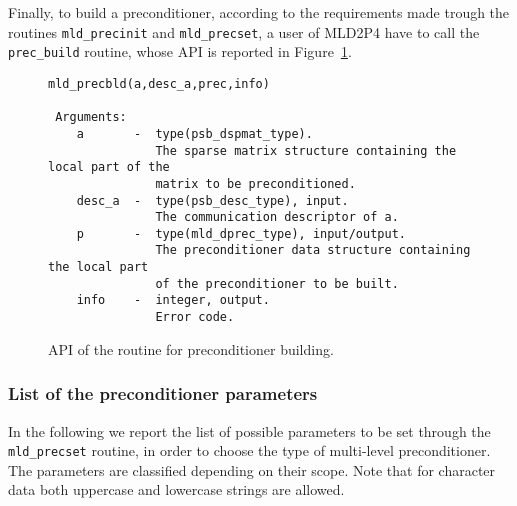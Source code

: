 %
Finally, to build a preconditioner, according to the requirements made trough the routines \verb|mld_precinit| and \verb|mld_precset|,
a user of MLD2P4 have to call the \verb|prec_build| routine, whose API is reported in Figure~\ref{fig:prcbld}.
%
\begin{figure}[h]
\begin{center}
{\small
\begin{verbatim} 
mld_precbld(a,desc_a,prec,info)

 Arguments:
    a       -  type(psb_dspmat_type).
               The sparse matrix structure containing the local part of the
               matrix to be preconditioned.
    desc_a  -  type(psb_desc_type), input.
               The communication descriptor of a.
    p       -  type(mld_dprec_type), input/output.
               The preconditioner data structure containing the local part
               of the preconditioner to be built.
    info    -  integer, output.
               Error code.              
\end{verbatim}
}
\end{center}
\caption{API of the routine for preconditioner building.\label{fig:prcbld}}
\end{figure}

\subsubsection{List of the preconditioner parameters\label{sec:list}}

In the following we report the list of possible parameters to be set through the \verb|mld_precset| routine,
in order to choose the type of multi-level preconditioner. The parameters are classified depending on their scope.
Note that for character data both uppercase and lowercase strings are allowed.


